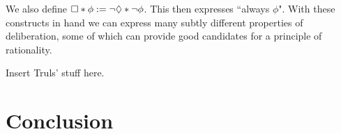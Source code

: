 \documentclass[greybox]{svmult}
\begin{document}
We also define $\square* \phi := \neg \lozenge* \neg \phi$. This then expresses ``always $\phi$". With these constructs in hand we can express many subtly different properties of deliberation, some of which can provide good candidates for a principle of rationality.

Insert Truls' stuff here.

\section{Conclusion}\label{sec:conc}
\end{document}
